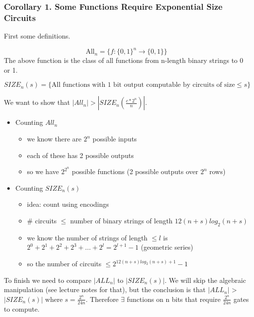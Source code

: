 \hr

\subsubsection*{Corollary 1. Some Functions Require Exponential Size Circuits}

{

First some definitions.

\[
    \text{All}_n = \{ f:\{0,1\}^n \rightarrow \{0, 1\} \}
\]
The above function is the class of all functions from n-length binary strings to 0 or 1.

\[
    SIZE_n(s) = \{ \text{All functions with 1 bit output computable by circuits of size} \le s \}
\]

We want to show that $|All_n| > |SIZE_n(\frac{c*2^n}{n})|$.
\begin{itemize}
    \item Counting $All_n$
    \begin{itemize}
        \item we know there are $2^n$ possible inputs
        \item each of these has 2 possible outputs
        \item so we have $2^{2^n}$ possible functions (2 possible outputs over $2^n$ rows)
    \end{itemize}
    \item Counting $SIZE_n(s)$
    \begin{itemize}
        \item idea: count using encodings
        \item \# circuits $\le$ number of binary strings of length $12(n + s)log_2(n + s)$
        \item we know the number of strings of length $\le l$ is $2^0 + 2^1 + 2^2 + 2^3 + ... + 2^l = 2^{l + 1} - 1$ (geometric series)
        \item so the number of circuits $\le 2^{12(n+s)log_2(n+s) + 1} - 1$
    \end{itemize}
\end{itemize}

To finish we need to compare $|ALL_n|$ to $|SIZE_n(s)|$. We will skip the algebraic manipulation (see lecture notes for that), but the conclusion is that $|ALL_n|$ > $|SIZE_n(s)|$ where $s = \frac{2^n}{24n}$. Therefore $\exists$ functions on n bits that require $\frac{2^n}{24n}$ gates to compute.
}

